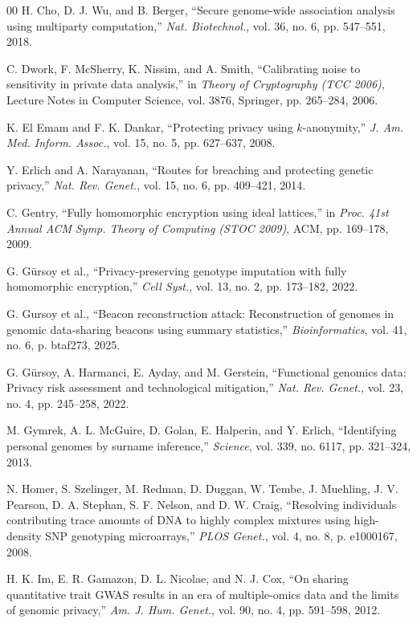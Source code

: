 \documentclass[conference]{IEEEtran}
\begin{document}
\begin{thebibliography}{00}
H. Cho, D. J. Wu, and B. Berger, ``Secure genome-wide association analysis
using multiparty computation,'' \textit{Nat. Biotechnol.}, vol. 36, no. 6,
pp. 547--551, 2018.

C. Dwork, F. McSherry, K. Nissim, and A. Smith, ``Calibrating noise to
sensitivity in private data analysis,'' in \textit{Theory of Cryptography
(TCC 2006)}, Lecture Notes in Computer Science, vol. 3876, Springer,
pp. 265--284, 2006.

K. El Emam and F. K. Dankar, ``Protecting privacy using $k$-anonymity,''
\textit{J. Am. Med. Inform. Assoc.}, vol. 15, no. 5, pp. 627--637, 2008.

Y. Erlich and A. Narayanan, ``Routes for breaching and protecting genetic
privacy,'' \textit{Nat. Rev. Genet.}, vol. 15, no. 6, pp. 409--421, 2014.

C. Gentry, ``Fully homomorphic encryption using ideal lattices,'' in
\textit{Proc. 41st Annual ACM Symp. Theory of Computing (STOC 2009)}, ACM,
pp. 169--178, 2009.

G. G\"ursoy et al., ``Privacy-preserving genotype imputation with fully
homomorphic encryption,'' \textit{Cell Syst.}, vol. 13, no. 2, pp. 173--182,
2022.

G. Gursoy et al., ``Beacon reconstruction attack: Reconstruction of genomes in
genomic data-sharing beacons using summary statistics,''
\textit{Bioinformatics}, vol. 41, no. 6, p. btaf273, 2025.

G. G\"ursoy, A. Harmanci, E. Ayday, and M. Gerstein, ``Functional genomics
data: Privacy risk assessment and technological mitigation,''
\textit{Nat. Rev. Genet.}, vol. 23, no. 4, pp. 245--258, 2022.

M. Gymrek, A. L. McGuire, D. Golan, E. Halperin, and Y. Erlich, ``Identifying
personal genomes by surname inference,'' \textit{Science}, vol. 339, no. 6117,
pp. 321--324, 2013.

N. Homer, S. Szelinger, M. Redman, D. Duggan, W. Tembe, J. Muehling,
J. V. Pearson, D. A. Stephan, S. F. Nelson, and D. W. Craig, ``Resolving
individuals contributing trace amounts of DNA to highly complex mixtures using
high-density SNP genotyping microarrays,'' \textit{PLOS Genet.}, vol. 4, no. 8,
p. e1000167, 2008.

H. K. Im, E. R. Gamazon, D. L. Nicolae, and N. J. Cox, ``On sharing
quantitative trait GWAS results in an era of multiple-omics data and the limits
of genomic privacy,'' \textit{Am. J. Hum. Genet.}, vol. 90, no. 4,
pp. 591--598, 2012.


\end{thebibliography}
\end{document}
